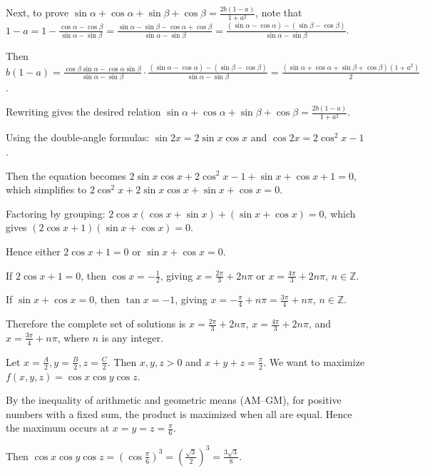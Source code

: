   Next, to prove $\sin \alpha + \cos \alpha + \sin \beta + \cos \beta = \frac{2b(1 - a)}{1 + a^2}$, note
  that $1 - a = 1 - \frac{\cos \alpha - \cos \beta}{\sin \alpha - \sin \beta} = \frac{\sin \alpha
    - \sin \beta - \cos \alpha + \cos \beta}{\sin \alpha - \sin \beta} = \frac{(\sin \alpha - \cos \alpha) -
    (\sin \beta - \cos \beta)}{\sin \alpha - \sin \beta}$.

  Then $b(1 - a) = \frac{\cos \beta \sin \alpha - \cos \alpha \sin \beta}{\sin \alpha
    - \sin \beta} \cdot \frac{(\sin \alpha - \cos \alpha) - (\sin \beta - \cos \beta)}{\sin \alpha
    - \sin \beta} = \frac{(\sin \alpha + \cos \alpha + \sin \beta + \cos \beta)(1 + a^2)}{2}$.

  Rewriting gives the desired relation $\sin \alpha + \cos \alpha + \sin \beta + \cos \beta = \frac{2b(1 -
    a)}{1 + a^2}$.
\item Using the double-angle formulas: $\sin 2x = 2 \sin x \cos x$ and $\cos 2x = 2 \cos^2 x - 1$.

  Then the equation becomes $2 \sin x \cos x + 2 \cos^2 x - 1 + \sin x + \cos x + 1 = 0$, which simplifies
  to $2 \cos^2 x + 2 \sin x \cos x + \sin x + \cos x = 0$.

  Factoring by grouping: $2 \cos x (\cos x + \sin x) + (\sin x + \cos x) = 0$, which gives $(2 \cos x +
  1)(\sin x + \cos x) = 0$.

  Hence either $2 \cos x + 1 = 0$ or $\sin x + \cos x = 0$.

  If $2 \cos x + 1 = 0$, then $\cos x = -\frac{1}{2}$, giving $x = \frac{2\pi}{3} + 2n\pi$ or $x
  = \frac{4\pi}{3} + 2n\pi$, $n \in \mathbb{Z}$.

  If $\sin x + \cos x = 0$, then $\tan x = -1$, giving $x = -\frac{\pi}{4} + n\pi = \frac{3\pi}{4} + n\pi$,
  $n \in \mathbb{Z}$.

  Therefore the complete set of solutions is $x = \frac{2\pi}{3} + 2n\pi$, $x = \frac{4\pi}{3} + 2n\pi$, and
  $x = \frac{3\pi}{4} + n\pi$, where $n$ is any integer.
\item Let $x = \frac{A}{2}, y = \frac{B}{2}, z = \frac{C}{2}$. Then $x, y, z > 0$ and $x + y + z
  = \frac{\pi}{2}$. We want to maximize $f(x, y, z) = \cos x \cos y \cos z$.

  By the inequality of arithmetic and geometric means (AM–GM), for positive numbers with a fixed sum, the
  product is maximized when all are equal. Hence the maximum occurs at $x = y = z = \frac{\pi}{6}$.

  Then $\cos x \cos y \cos z = (\cos \frac{\pi}{6})^3 = \left(\frac{\sqrt{3}}{2}\right)^3
  = \frac{3\sqrt{3}}{8}$.

